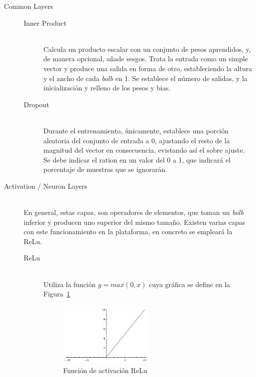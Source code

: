 \begin{description}
\vspace{70pt}
\item[Common Layers] \hfill
	\begin{description}
	\item[Inner Product] \hfill 
	\vspace{5pt}
	\\
	Calcula un producto escalar con un conjunto de pesos aprendidos, y, de manera opcional, añade sesgos. Trata la entrada como un simple vector y produce una salida en forma de otro, estableciendo la altura y el ancho de cada \textit{bolb} en 1. Se establece el número de salidas, y la inicialización y relleno de los pesos y bias.
	\vspace{10pt}
	\item[Dropout] \hfill 
	\vspace{5pt}
	\\
	Durante el entrenamiento, únicamente, establece una porción aleatoria del conjunto de entrada a 0, ajustando el resto de la magnitud del vector en consecuencia, evistando así el sobre ajuste. Se debe indicar el ration en un valor del 0 a 1, que indicará el porcentaje de muestras que se ignorarán.
	\end{description}

\vspace{15pt}	
\item[Activation / Neuron Layers] \hfill  
\vspace{10pt}
\\
	En general, estas capas, son operadores de elementos, que toman un \textit{bolb} inferior y producen uno superior del mismo tamaño. Existen varias capas con este funcionamiento en la plataforma, en concreto se empleará la ReLu.
	\vspace{10pt}
	\begin{description}
	\item[ReLu] \hfill  
	\vspace{5pt}
	\\
		Utiliza la función $y=max(0,x)$ cuya gráfica se define en la Figura~\ref{fig.reLu}
		\begin{figure}[h!]
			\begin{center}
				\includegraphics[width=0.5\textwidth]{figures/relu.jpeg}
				\caption{Función de activación ReLu}
				\label{fig.reLu}
			\end{center}
		\end{figure} 
	\end{description}
	

\end{description}
